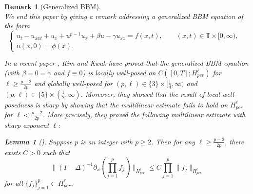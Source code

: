\documentclass[10pt,a4paper,final]{article}
\numberwithin{equation}{section}
\newtheorem{lemma}[theorem]{Lemma}
\newtheorem{remark}[theorem]{Remark}
\newcommand{\bT}{\mathbb{T}}
\newcommand{\Gb}{\beta}
\newcommand{\Gg}{\gamma}
\begin{document}
\begin{remark}[Generalized BBM]\label{multi}\ \\
    We end this paper by giving a remark addressing a generalized BBM equation of the form
\begin{equation} \label{mainp}
\begin{cases}
    u_t-u_{xxt}+u_x+u^{p-1}u_x+\Gb u-\Gg u_{xx}=f(x,t), \quad\quad (x, t)\in \bT\times [0, \infty),&\\
    u(x,0)=\phi(x).&
\end{cases}
\end{equation}

    In a recent paper \cite{KimK}, Kim and Kwak have proved that the generalized BBM equation (with $\Gb=0=\Gg$ and $f\equiv0$) is locally well-posed on $C([0,T];H^\ell_{per})$ for $\ell\geq \frac{p-2}{2p}$ and globally well-posed for $(p,\ell)\in \{3\}\times [\frac{1}{4},\infty)$ and $(p,\ell)\in \{5\}\times (\frac{1}{2},\infty)$. Moreover, they showed that the result of local well-posedness is sharp by showing that the multilinear estimate fails to hold on $H^\ell_{per}$ for $\ell<\frac{p-2}{2p}$. More precisely, they proved the following multilinear estimate with sharp exponent $\ell$:
    
    \begin{lemma}[\cite{KimK}] \label{kimk}
        Suppose $p$ is an integer with $p\geq 2$. Then for any $\ell\geq \frac{p-2}{2p}$, there exists $C>0$ such that 
        $$\|(I-\Delta)^{-1}\partial_x(\prod_{j=1}^p f_j)\|_{H^\ell_{per}}\leq C\prod_{j=1}^p \|f_j\|_{H^\ell_{per}}$$
        for all $\{f_j\}_{j=1}^{p}\subset H^\ell_{per}$.
    \end{lemma}

    


\end{remark}
\end{document}
